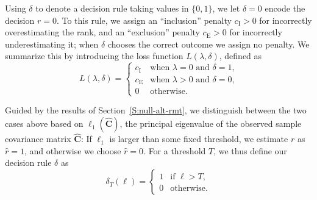 \documentclass[final]{IEEEtran}
\newcommand{\matrixsymbol}{\boldsymbol}
\newcommand{\mhC}{\widehat{\matrixsymbol{C}}}
\newcommand{\ce}{c_\text{E}}
\newcommand{\ci}{c_\text{I}}
\begin{document}
Using $\delta$ to denote a decision rule taking values in $\{ 0,1 \}$, we let $\delta = 0$ encode the decision $r = 0$. To this rule, we assign an ``inclusion'' penalty $\ci > 0$ for incorrectly overestimating the rank, and an ``exclusion'' penalty $\ce > 0$ for incorrectly underestimating it; when $\delta$ chooses the correct outcome we assign no penalty. We summarize this by introducing the loss function $L(\lambda, \delta)$, defined as
\begin{equation*}
    L(\lambda, \delta)
    =
    \begin{cases}
        \ci &\text{when $\lambda = 0$ and $\delta = 1$,} \\
        \ce &\text{when $\lambda > 0$ and $\delta = 0$,} \\
        0   &\text{otherwise.}
    \end{cases}
\end{equation*}

Guided by the results of Section~\ref{S:null-alt-rmt}, we distinguish between the two cases above based on $\ell_1(\mhC)$, the principal eigenvalue of the observed sample covariance matrix $\mhC$: If $\ell_1$ is larger than some fixed threshold, we estimate $r$ as $\hat r = 1$, and otherwise we choose $\hat r = 0$.  For a threshold $T$, we thus define our decision rule $\delta$ as
\begin{equation}\label{E:delta}
    \delta_T (\ell)
    =
    \begin{cases}
        1 &\text{if $\ell > T$,} \\
        0 &\text{otherwise.}
    \end{cases}
\end{equation}
\end{document}
